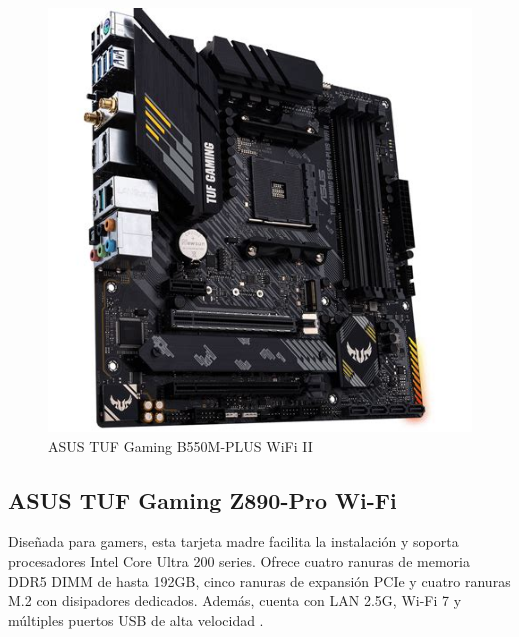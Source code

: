 \begin{figure}[H]
  \centering
  \includegraphics[scale=0.2]{imagenes/asusb550.png}
  \caption{ASUS TUF Gaming B550M-PLUS WiFi II}
\end{figure}

\subsection{ASUS TUF Gaming Z890-Pro Wi-Fi}

Diseñada para gamers, esta tarjeta madre facilita la instalación y soporta procesadores Intel Core Ultra 200 series. Ofrece cuatro ranuras de memoria DDR5 DIMM de hasta 192GB, cinco ranuras de expansión PCIe y cuatro ranuras M.2 con disipadores dedicados. Además, cuenta con LAN 2.5G, Wi-Fi 7 y múltiples puertos USB de alta velocidad \cite{asustufz890}.


